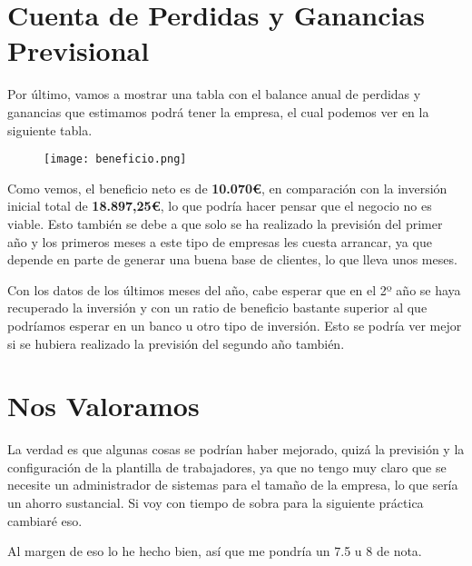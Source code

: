 \section{Cuenta de Perdidas y Ganancias Previsional}
Por último, vamos a mostrar una tabla con el balance anual de perdidas y ganancias que estimamos podrá tener la empresa, el cual podemos ver en la siguiente tabla.

\begin{figure}[H]
    \centering
    \texttt{[image: beneficio.png]}
\end{figure}

Como vemos, el beneficio neto es de \textbf{10.070€}, en comparación con la inversión inicial total de \textbf{18.897,25€}, lo que podría hacer pensar que el negocio no es viable. Esto también se debe a que solo se ha realizado la previsión del primer año y los primeros meses a este tipo de empresas les cuesta arrancar,  ya que depende en parte de generar una buena base de clientes, lo que lleva unos meses.

Con los datos de los últimos meses del año, cabe esperar que en el 2º año se haya recuperado la inversión y con un ratio de beneficio bastante superior al que podríamos esperar en un banco u otro tipo de inversión. Esto se podría ver mejor si se hubiera realizado la previsión del segundo año también.

\section{Nos Valoramos}
La verdad es que algunas cosas se podrían haber mejorado, quizá la previsión y la configuración de la plantilla de trabajadores, ya que no tengo muy claro que se necesite un administrador de sistemas para el tamaño de la empresa, lo que sería un ahorro sustancial. Si voy con tiempo de sobra para la siguiente práctica cambiaré eso.

Al margen de eso lo he hecho bien, así que me pondría un 7.5 u 8 de nota.


%
%

